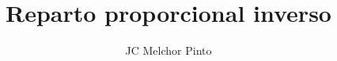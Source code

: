 \documentclass[12pt,addpoints,answers]{guia}
\title{Reparto proporcional inverso}
\author{JC Melchor Pinto}
\begin{document}
\pagestyle{headandfoot}

\INFO
\begin{questions}
    
    
    \newpage
    
\end{questions}

\end{document}
